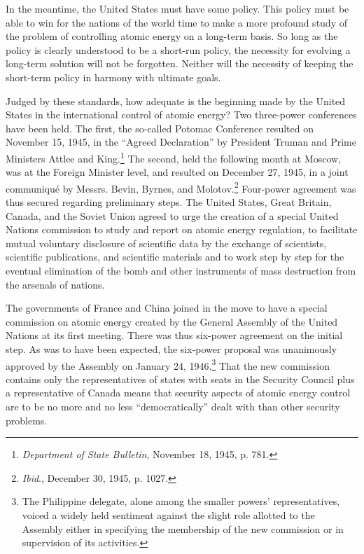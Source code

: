 In the meantime, the United States must have some policy. This policy must be able to win for the nations of the world time to make a more profound study of the problem of controlling atomic energy on a long-term basis. So long as the policy is clearly understood to be a short-run policy, the necessity for evolving a long-term solution will not be forgotten. Neither will the necessity of keeping the short-term policy in harmony with ultimate goals.

Judged by these standards, how adequate is the beginning made by the United States in the international control of atomic energy? Two three-power conferences have been held. The first, the so-called Potomac Conference resulted on November 15, 1945, in the ``Agreed Declaration'' by President Truman and Prime Ministers Attlee and King.\footnote{\textit{Department of State Bulletin}, November 18, 1945, p. 781.} The second, held the following month at Moscow, was at the Foreign Minister level, and resulted on December 27, 1945, in a joint communiqu\'e by Messrs. Bevin, Byrnes, and Molotov.\footnote{\textit{Ibid}., December 30, 1945, p. 1027.} Four-power agreement was thus secured regarding preliminary steps. The United States, Great Britain, Canada, and the Soviet Union agreed to urge the creation of a special United Nations commission to study and report on atomic energy regulation, to facilitate mutual voluntary disclosure of scientific data by the exchange of scientists, scientific publications, and scientific materials and to work step by step for the eventual elimination of the bomb and other instruments of mass destruction from the arsenals of nations.

The governments of France and China joined in the move to have a special commission on atomic energy created by the General Assembly of the United Nations at its first meeting. There was thus six-power agreement on the initial step. As was to have been expected, the six-power proposal was unanimously approved by the Assembly on January 24, 1946.\footnote{The Philippine delegate, alone among the smaller powers' representatives, voiced a widely held sentiment against the slight role allotted to the Assembly either in specifying the membership of the new commission or in supervision of its activities.} That the new commission contains only the representatives of states with seats in the Security Council plus a representative of Canada means that security aspects of atomic energy control are to be no more and no less ``democratically'' dealt with than other security problems.

